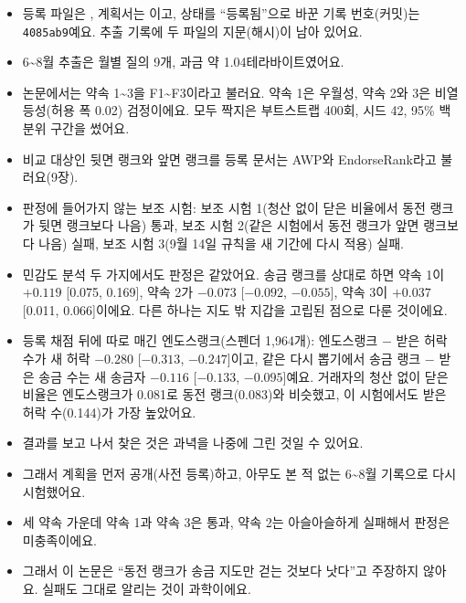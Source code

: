 \begin{deeper}[진짜 이름과 숫자]
\begin{itemize}
\item 등록 파일은 , 계획서는 이고, 상태를 “등록됨”으로 바꾼 기록 번호(커밋)는 \texttt{4085ab9}예요. 추출 기록에 두 파일의 지문(해시)이 남아 있어요.
\item 6\textasciitilde{}8월 추출은 월별 질의 9개, 과금 약 1.04테라바이트였어요.
\item 논문에서는 약속 1\textasciitilde{}3을 F1\textasciitilde{}F3이라고 불러요. 약속 1은 우월성, 약속 2와 3은 비열등성(허용 폭 0.02) 검정이에요. 모두 짝지은 부트스트랩 400회, 시드 42, 95\% 백분위 구간을 썼어요.
\item 비교 대상인 뒷면 랭크와 앞면 랭크를 등록 문서는 AWP와 EndorseRank라고 불러요(9장).
\item 판정에 들어가지 않는 보조 시험: 보조 시험 1(청산 없이 닫은 비율에서 동전 랭크가 뒷면 랭크보다 나음) 통과, 보조 시험 2(같은 시험에서 동전 랭크가 앞면 랭크보다 나음) 실패, 보조 시험 3(9월 14일 규칙을 새 기간에 다시 적용) 실패.
\item 민감도 분석 두 가지에서도 판정은 같았어요. 송금 랭크를 상대로 하면 약속 1이 $+0.119$ [0.075, 0.169], 약속 2가 $-0.073$ [$-0.092$, $-0.055$], 약속 3이 $+0.037$ [0.011, 0.066]이에요. 다른 하나는 지도 밖 지갑을 고립된 점으로 다룬 것이에요.
\item 등록 채점 뒤에 따로 매긴 엔도스랭크(스펜더 1,964개): 엔도스랭크 $-$ 받은 허락 수가 새 허락 $-0.280$ [$-0.313$, $-0.247$]이고, 같은 다시 뽑기에서 송금 랭크 $-$ 받은 송금 수는 새 송금자 $-0.116$ [$-0.133$, $-0.095$]예요. 거래자의 청산 없이 닫은 비율은 엔도스랭크가 0.081로 동전 랭크(0.083)와 비슷했고, 이 시험에서도 받은 허락 수(0.144)가 가장 높았어요.
\end{itemize}
\end{deeper}

\begin{learned}
\begin{itemize}
\item 결과를 보고 나서 찾은 것은 과녁을 나중에 그린 것일 수 있어요.
\item 그래서 계획을 먼저 공개(사전 등록)하고, 아무도 본 적 없는 6\textasciitilde{}8월 기록으로 다시 시험했어요.
\item 세 약속 가운데 약속 1과 약속 3은 통과, 약속 2는 아슬아슬하게 실패해서 판정은 미충족이에요.
\item 그래서 이 논문은 “동전 랭크가 송금 지도만 걷는 것보다 낫다”고 주장하지 않아요. 실패도 그대로 알리는 것이 과학이에요.
\end{itemize}
\end{learned}

